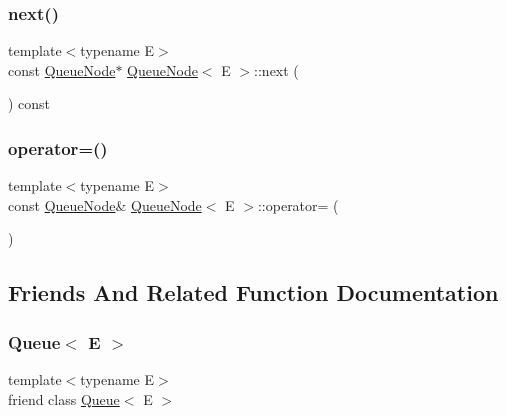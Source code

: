 \mbox{\label{classQueueNode_ada477e4f309f29383112dbda473dd985}} 
\subsubsection{\texorpdfstring{next()}{next()}\hspace{0.1cm}{\footnotesize\ttfamily [2/2]}}
{\footnotesize\ttfamily template$<$typename E$>$ \\
const \hyperlink{classQueueNode}{Queue\+Node}$\ast$ \hyperlink{classQueueNode}{Queue\+Node}$<$ E $>$\+::next (\begin{DoxyParamCaption}{ }\end{DoxyParamCaption}) const\hspace{0.3cm}{\ttfamily [inline]}}

\mbox{\label{classQueueNode_a8635bbe6310e011ef4fcf1a01566dbb7}} 
\subsubsection{\texorpdfstring{operator=()}{operator=()}}
{\footnotesize\ttfamily template$<$typename E$>$ \\
const \hyperlink{classQueueNode}{Queue\+Node}\& \hyperlink{classQueueNode}{Queue\+Node}$<$ E $>$\+::operator= (\begin{DoxyParamCaption}\item[{const \hyperlink{classQueueNode}{Queue\+Node}$<$ E $>$ \&}]{ }\end{DoxyParamCaption})\hspace{0.3cm}{\ttfamily [private]}}



\subsection{Friends And Related Function Documentation}
\mbox{\label{classQueueNode_ad4336229b1d7c3626e4ba69f236b202d}} 
\subsubsection{\texorpdfstring{Queue$<$ E $>$}{Queue< E >}}
{\footnotesize\ttfamily template$<$typename E$>$ \\
friend class \hyperlink{classQueue}{Queue}$<$ E $>$\hspace{0.3cm}{\ttfamily [friend]}}



